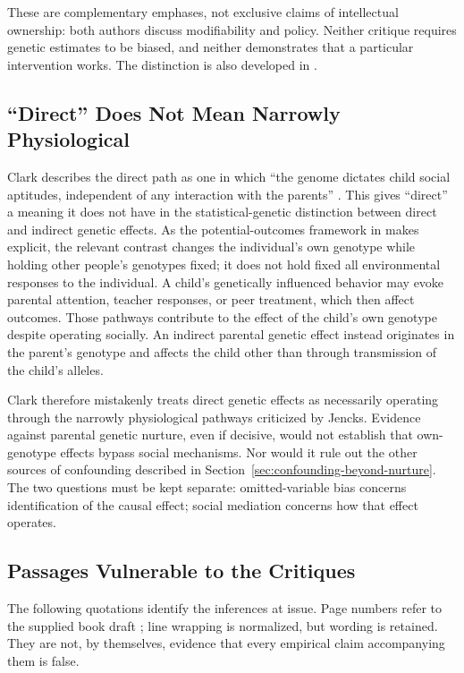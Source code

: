 These are complementary emphases, not exclusive claims of intellectual
ownership: both authors discuss modifiability and policy. Neither critique
requires genetic estimates to be biased, and neither demonstrates that a
particular intervention works. The distinction is also developed in
\citet[secs.~3.4 and 3.6]{BenjaminEtAl2026}.

\subsection{``Direct'' Does Not Mean Narrowly Physiological}

Clark describes the direct path as one in which ``the genome dictates
child social aptitudes, independent of any interaction with the parents''
\citep[p.~286]{Clark2026}. This gives ``direct'' a meaning it does not
have in the statistical-genetic distinction between direct and indirect
genetic effects. As the potential-outcomes framework in
\citet[secs.~3.1 and 3.4]{BenjaminEtAl2026} makes explicit, the relevant
contrast changes the individual's own genotype while holding other
people's genotypes fixed; it does not hold fixed all environmental
responses to the individual. A child's genetically influenced behavior
may evoke parental attention, teacher responses, or peer treatment, which
then affect outcomes. Those pathways contribute to the effect of the
child's own genotype despite operating socially. An indirect parental
genetic effect instead originates in the parent's genotype and affects
the child other than through transmission of the child's alleles.

Clark therefore mistakenly treats direct genetic effects as necessarily
operating through the narrowly physiological pathways criticized by
Jencks. Evidence against parental genetic nurture, even if decisive,
would not establish that own-genotype effects bypass social mechanisms.
Nor would it rule out the other sources of confounding described in
Section~\ref{sec:confounding-beyond-nurture}. The two questions must be
kept separate: omitted-variable bias concerns identification of the
causal effect; social mediation concerns how that effect operates.

\subsection{Passages Vulnerable to the Critiques}

The following quotations identify the inferences at issue. Page numbers
refer to the supplied book draft \citep{Clark2026}; line wrapping is
normalized, but wording is retained. They are not, by themselves, evidence
that every empirical claim accompanying them is false.

